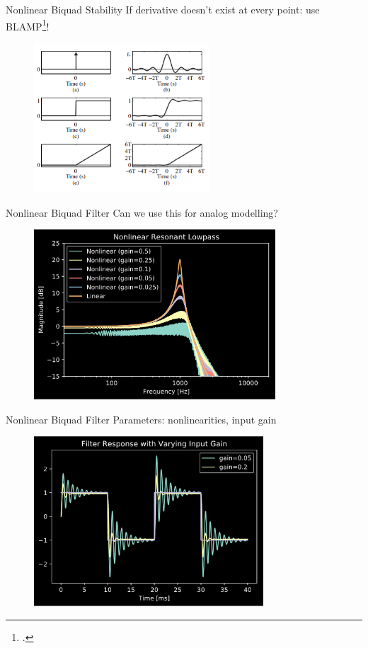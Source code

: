 \begin{frame}{Nonlinear Biquad Stability}
    If derivative doesn't exist at every point: use BLAMP\footcite{BLAMP}!
    \begin{figure}
        \includegraphics[height=2.2in]{Figures/blamp.png}
    \end{figure}
\end{frame}

\begin{frame}{Nonlinear Biquad Filter}
    Can we use this for analog modelling?
    \begin{figure}
        \includegraphics[height=2.5in]{../NonlinearBiquad/Pics/NL-LPF.png}
    \end{figure}
\end{frame}

\begin{frame}{Nonlinear Biquad Filter}
    Parameters: nonlinearities, input gain
    \begin{figure}
        \includegraphics[height=2.5in]{../NonlinearBiquad/Pics/50-Hz_Response.png}
    \end{figure}
\end{frame}

